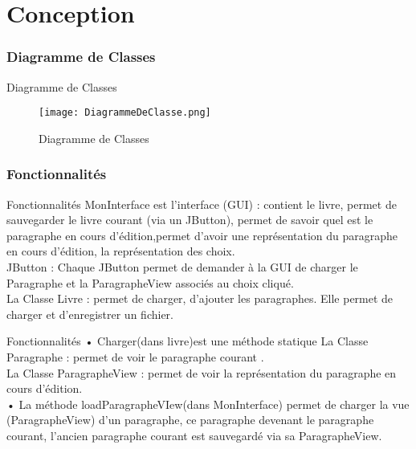 \documentclass{beamer}
\begin{document}
\section{\textbf{Conception}}
\subsubsection{Diagramme de Classes}
\begin{frame}{Diagramme de Classes}
 \begin{figure}[ht]
  \begin{center}
    \texttt{[image: DiagrammeDeClasse.png]} 
  \end{center}
  \caption{Diagramme de Classes}
  \label{fig:mon_image}
 \end{figure} 
\end{frame}{}
   

    \subsubsection{Fonctionnalités}
\begin{frame}{Fonctionnalités}
    MonInterface est l’interface (GUI) : contient le livre, permet de sauvegarder le livre courant (via un JButton), permet de savoir quel est le paragraphe en cours d’édition,permet d’avoir une représentation du paragraphe en cours d’édition, la représentation
    des choix.\\
    JButton : Chaque JButton permet de demander à la GUI de charger le Paragraphe et la ParagrapheView associés au choix cliqué.\\
    La Classe Livre : permet de charger, d’ajouter les paragraphes. Elle permet de charger et d’enregistrer un fichier.\\
\end{frame}
\begin{frame}{Fonctionnalités}
    • Charger(dans livre)est une méthode statique La Classe Paragraphe : permet de voir le paragraphe courant .\\
    La Classe ParagrapheView : permet de voir la représentation du paragraphe en cours d’édition.\\
    • La méthode loadParagrapheVIew(dans MonInterface) permet de charger la vue (ParagrapheView) d’un paragraphe, ce paragraphe devenant le paragraphe courant, l’ancien paragraphe courant est sauvegardé via sa ParagrapheView.\\
\end{frame}{}
\end{document}
